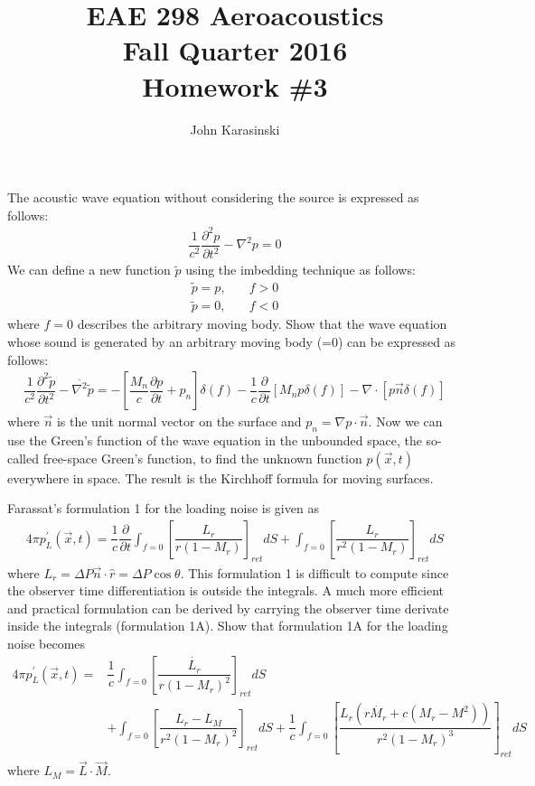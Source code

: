 \documentclass[onecolumn,10pt]{jhwhw}
\author{John Karasinski}
\title{EAE 298 Aeroacoustics \\ Fall Quarter 2016 \\ Homework \#3}
\begin{document}
\maketitle

\problem{[50 points]}
The acoustic wave equation without considering the source is expressed as follows:
\begin{align*}
\dfrac{1}{c^2} \dfrac{\partial^2 p}{\partial t^2} - \nabla^2 p = 0
\end{align*}
We can define a new function $\widetilde{p}$ using the imbedding technique as follows:
\begin{align*}
\widetilde{p} = p, & \hspace{1em} f > 0 \\
\widetilde{p} = 0, & \hspace{1em} f < 0
\end{align*}
where $f=0$ describes the arbitrary moving body. Show that the wave equation whose sound is generated by an arbitrary moving body (=0) can be expressed as follows:
\begin{align*}
\dfrac{1}{c^2} \dfrac{\partial^2 \widetilde{p}}{\partial t^2}
- \overline{\nabla^2} \widetilde{p}
= - \left [ \dfrac{M_n}{c} \dfrac{\partial p}{\partial t} + p_n \right] \delta (f)
- \dfrac{1}{c} \dfrac{\partial}{\partial t} \left[ M_n p \delta(f) \right]
- \nabla \cdot \left[ p \vec{n} \delta (f) \right]
\end{align*}
where $\vec{n}$ is the unit normal vector on the surface and $p_n = \nabla p \cdot \vec{n}$. Now we can use the Green’s function of the wave equation in the unbounded space, the so-called free-space Green’s function, to find the unknown function $p(\vec{x}, t)$ everywhere in space. The result is the Kirchhoff formula for moving surfaces.

\problem{[50 points]}
Farassat’s formulation 1 for the loading noise is given as
\begin{align*}
4 \pi p_L^{\prime}(\vec{x}, t) = \dfrac{1}{c} \dfrac{\partial}{\partial t}
\int_{f=0} \left[ \dfrac{L_r}{r(1-M_r)} \right]_{ret} dS + \int_{f=0} \left[ \dfrac{L_r}{r^2(1-M_r)} \right]_{ret} dS
\end{align*}
where $L_r = \Delta P \vec{n} \cdot \hat{r} = \Delta P \cos \theta$. This formulation 1 is difficult to compute since the observer time differentiation is outside the integrals. A much more efficient and practical formulation can be derived by carrying the observer time derivate inside the integrals (formulation 1A). Show that formulation 1A for the loading noise becomes
\begin{align*}
4 \pi p_L^{\prime}(\vec{x}, t) =& \dfrac{1}{c} \int_{f=0} \left[ \dfrac{\dot{L_r}}{r(1-M_r)^2} \right]_{ret} dS \\
&+ \int_{f=0} \left[ \dfrac{L_r-L_M}{r^2(1-M_r)^2} \right]_{ret} dS
+ \dfrac{1}{c} \int_{f=0} \left[ \dfrac{L_r (r \dot{M_r} + c(M_r-M^2))}{r^2(1-M_r)^3} \right]_{ret} dS
\end{align*}
where $L_M = \vec{L} \cdot \vec{M}$.
\end{document}
